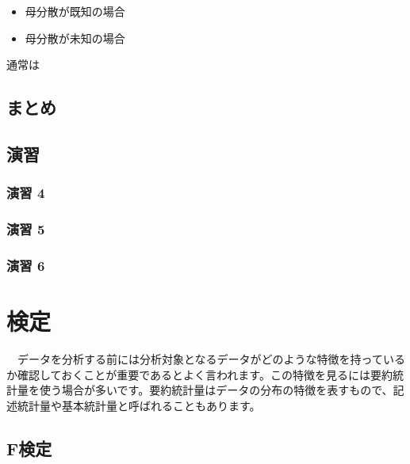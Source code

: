 \documentclass[
  12pt,
]{book}
\providecommand{\tightlist}{%
  \setlength{\itemsep}{0pt}\setlength{\parskip}{0pt}}
\begin{document}
\begin{itemize}
\tightlist
\item
  母分散が既知の場合
\item
  母分散が未知の場合
\end{itemize}

通常は

\hypertarget{ux307eux3068ux3081-2}{%
\subsection{まとめ}\label{ux307eux3068ux3081-2}}

\hypertarget{ux6f14ux7fd2-4}{%
\subsection{演習}\label{ux6f14ux7fd2-4}}

\hypertarget{ux6f14ux7fd2-4-1}{%
\subsubsection*{演習 4}\label{ux6f14ux7fd2-4-1}}

\hypertarget{ux6f14ux7fd2-5}{%
\subsubsection*{演習 5}\label{ux6f14ux7fd2-5}}

\hypertarget{ux6f14ux7fd2-6}{%
\subsubsection*{演習 6}\label{ux6f14ux7fd2-6}}

\hypertarget{ux691cux5b9a}{%
\section{検定}\label{ux691cux5b9a}}

　データを分析する前には分析対象となるデータがどのような特徴を持っているか確認しておくことが重要であるとよく言われます。この特徴を見るには要約統計量を使う場合が多いです。要約統計量はデータの分布の特徴を表すもので、記述統計量や基本統計量と呼ばれることもあります。

\hypertarget{fux691cux5b9a}{%
\subsection{F検定}\label{fux691cux5b9a}}
\end{document}
